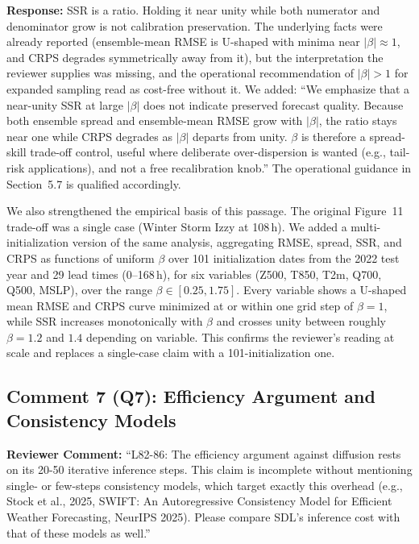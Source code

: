 \documentclass[12pt]{article}
\begin{document}
\textbf{Response:} SSR is a ratio. Holding it near unity while both numerator and denominator grow is
not calibration preservation. The underlying facts were already reported
(ensemble-mean RMSE is U-shaped with minima near $|\beta|\approx1$, and CRPS degrades
symmetrically away from it), but the interpretation the reviewer supplies was
missing, and the operational recommendation of $|\beta|>1$ for expanded sampling read
as cost-free without it. We added: ``We emphasize that a near-unity SSR at
large $|\beta|$ does not indicate preserved forecast quality. Because both ensemble
spread and ensemble-mean RMSE grow with $|\beta|$, the ratio stays near one while
CRPS degrades as $|\beta|$ departs from unity. $\beta$ is therefore a spread-skill
trade-off control, useful where deliberate over-dispersion is wanted (e.g., tail-risk
applications), and not a free recalibration knob.'' The operational guidance in Section~5.7 is
qualified accordingly.

We also strengthened the empirical basis of this passage. The original Figure~11
trade-off was a single case (Winter Storm Izzy at 108\,h). We added a
multi-initialization version of the same analysis, aggregating RMSE, spread, SSR, and
CRPS as functions of uniform $\beta$ over 101 initialization dates from the 2022 test
year and 29 lead times (0--168\,h), for six variables (Z500, T850, T2m, Q700, Q500,
MSLP), over the range $\beta \in [0.25, 1.75]$. Every variable shows a U-shaped mean
RMSE and CRPS curve minimized at or within one grid step of $\beta=1$, while SSR
increases monotonically with $\beta$ and crosses unity between roughly $\beta=1.2$
and $1.4$ depending on variable. This confirms the reviewer's reading at scale and replaces a single-case claim
with a 101-initialization one.

\subsection*{Comment 7 (Q7): Efficiency Argument and Consistency Models}

\textbf{Reviewer Comment:} ``L82-86: The efficiency argument against diffusion rests
on its 20-50 iterative inference steps. This claim is incomplete without mentioning
single- or few-steps consistency models, which target exactly this overhead (e.g.,
Stock et al., 2025, SWIFT: An Autoregressive Consistency Model for Efficient Weather
Forecasting, NeurIPS 2025). Please compare SDL's inference cost with that of these
models as well.''
\end{document}
